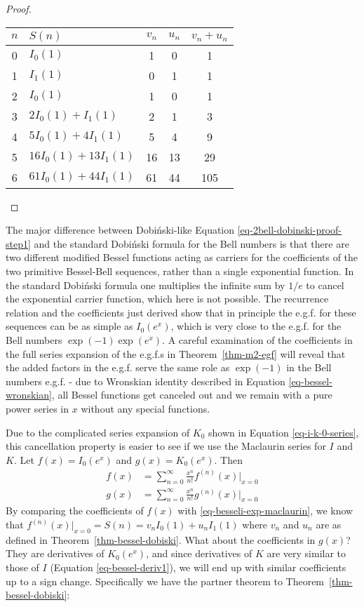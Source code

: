 \documentclass[a4paper]{amsart}
\begin{document}
\begin{proof}
\begin{center}
\begin{tabular}{|c|l|c|c|c|}
\hline
$n$ & $S(n)$                & $v_n$ & $u_n$ & $v_n+u_n$ \\
\hline
0   & $I_0(1)$              & 1     & 0     & 1         \\
1   & $I_1(1)$              & 0     & 1     & 1         \\
2   & $I_0(1)$              & 1     & 0     & 1         \\
3   & $2I_0(1)+I_1(1)$    & 2     & 1     & 3         \\
4   & $5I_0(1)+4I_1(1)$   & 5     & 4     & 9         \\
5   & $16I_0(1)+13I_1(1)$ & 16    & 13    & 29        \\
6   & $61I_0(1)+44I_1(1)$ & 61    & 44 &    105 \\ 
\hline
\end{tabular}
\end{center}
\end{proof}

The major difference between Dobiński-like Equation \eqref{eq-2bell-dobinski-proof-step1} and the standard Dobiński formula for the Bell numbers is that there are two different modified Bessel functions acting as carriers for the coefficients of the two primitive Bessel-Bell sequences, rather than a single exponential function. In the standard Dobiński formula one multiplies the infinite sum by $1/e$ to cancel the exponential carrier function, which here is not possible. The recurrence relation and the coefficients just derived show that in principle the e.g.f. for these sequences can be as simple as $I_0(e^x)$, which is very close to the e.g.f. for the Bell numbers $\exp(-1)\exp(e^x)$. A careful examination of the coefficients in the full series expansion of the e.g.f.s in Theorem~\ref{thm-m2-egf} will reveal that the added factors in the e.g.f. serve the same role as $\exp(-1)$ in the Bell numbers e.g.f. - due to Wronskian identity described in Equation \eqref{eq-bessel-wronskian}, all Bessel functions get canceled out and we remain with a pure power series in $x$ without any special functions.

Due to the complicated series expansion of $K_0$ shown in Equation \eqref{eq-i-k-0-series}, this cancellation property is easier to see if we use the Maclaurin series for $I$ and $K$. Let $f(x) = I_0(e^x)$ and $g(x) = K_0(e^x)$. Then
\[
\begin{aligned}
f(x) &= \sum_{n=0}^\infty \frac{x^n}{n!} f^{(n)}(x)|_{x=0} \\
g(x) &= \sum_{n=0}^\infty \frac{x^n}{n!} g^{(n)}(x)|_{x=0}
\end{aligned}
\]
By comparing the coefficients of $f(x)$ with \eqref{eq-besseli-exp-maclaurin}, we know that $f^{(n)}(x)|_{x=0} = S(n) = v_n I_0(1)+u_nI_1(1)$ where $v_n$ and $u_n$ are as defined in Theorem~\ref{thm-bessel-dobiski}. What about the coefficients in $g(x)$? They are derivatives of $K_0(e^x)$, and since derivatives of $K$ are very similar to those of $I$ (Equation \ref{eq-bessel-deriv1}), we will end up with similar coefficients up to a sign change. Specifically we have the partner theorem to Theorem~\ref{thm-bessel-dobiski}:
\end{document}
